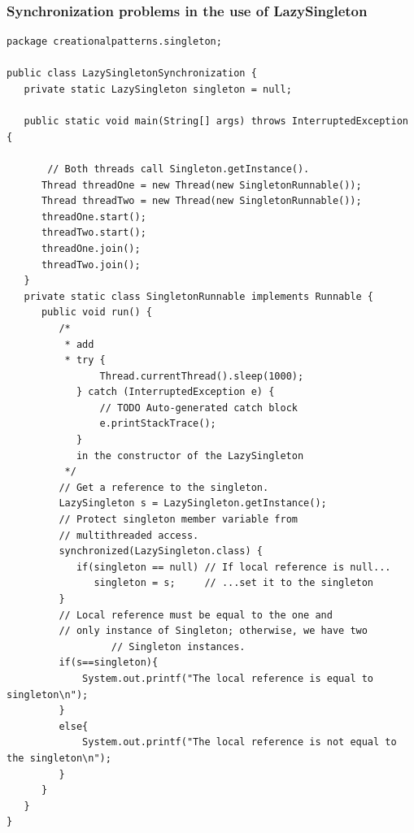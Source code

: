 \documentclass{article}
\begin{document}
\subsubsection{Synchronization problems in the use of LazySingleton}
\begin{lstlisting}
package creationalpatterns.singleton;

public class LazySingletonSynchronization {
   private static LazySingleton singleton = null;
	
   public static void main(String[] args) throws InterruptedException {
		
	   // Both threads call Singleton.getInstance().
      Thread threadOne = new Thread(new SingletonRunnable());
      Thread threadTwo = new Thread(new SingletonRunnable());
      threadOne.start();
      threadTwo.start();
      threadOne.join();
      threadTwo.join();
   }
   private static class SingletonRunnable implements Runnable {
      public void run() {
    	 /*
    	  * add 
    	  * try {
				Thread.currentThread().sleep(1000);
			} catch (InterruptedException e) {
				// TODO Auto-generated catch block
				e.printStackTrace();
			}
			in the constructor of the LazySingleton 
    	  */
         // Get a reference to the singleton.
         LazySingleton s = LazySingleton.getInstance();
         // Protect singleton member variable from
         // multithreaded access.
         synchronized(LazySingleton.class) {
            if(singleton == null) // If local reference is null...
               singleton = s;     // ...set it to the singleton
         }
         // Local reference must be equal to the one and
         // only instance of Singleton; otherwise, we have two
                  // Singleton instances.
         if(s==singleton){
        	 System.out.printf("The local reference is equal to singleton\n");
         }
         else{
        	 System.out.printf("The local reference is not equal to the singleton\n");
         }
      }
   }
}
\end{lstlisting}
\end{document}
